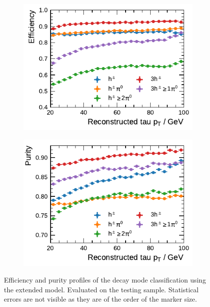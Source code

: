 \begin{figure}[htb]
  \begin{subfigure}{0.48\textwidth}
    \centering
    \includegraphics{./figures/decay_mode_classification/combined_sub_e_moments_shots_conv_ptcut_1_5/efficiency_profile.pdf}
    \vspace*{-1.6em}
    \subcaption{}
  \end{subfigure}\hfill
  \begin{subfigure}{0.48\textwidth}
    \centering
    \includegraphics{./figures/decay_mode_classification/combined_sub_e_moments_shots_conv_ptcut_1_5/purity_profile.pdf}
    \vspace*{-1.6em}
    \subcaption{}
  \end{subfigure}
  \caption{Efficiency and purity profiles of the decay mode classification using
    the extended model. Evaluated on the testing sample. Statistical errors are
    not visible as they are of the order of the marker size.}
  \label{fig:mode_efficiency_purity}
\end{figure}

